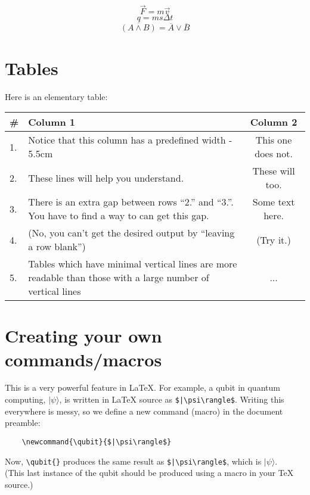 \documentclass[a4paper,10pt,titlepage]{article}
\newcommand{\qubit}{$|\psi\rangle$}
\begin{document}
\[\vec{F} = m\vec{v}\]
\[q = ms\Delta t\]
\[\overline{(A\land B)} = \overline{A}\lor \overline{B}\]

\section{Tables}

Here is an elementary table:
\begin{center}
  \begin{tabular}{l p{5.5cm} c}
    \textbf{\#} & \textbf{Column 1} & \textbf{Column 2} \\
    \hline
    \hline
    1. & Notice that this column has a predefined width - 5.5cm & This one does not. \\\hline
    2. & These lines will help you understand. & These will too. \\[50pt]\hline
    3. & There is an extra gap between rows ``2.'' and ``3.''. You have to find a way to can get this gap. & Some text here. \\\hline
    4. & (No, you can't get the desired output by ``leaving a row blank'') & (Try it.) \\ \hline
    5. & Tables which have minimal vertical lines are more readable than those with a large number of vertical lines & ... \\\hline
    \hline
  \end{tabular}
\end{center}

\section{Creating your own commands/macros}

This is a very powerful feature in \LaTeX{}. For example, a qubit in
quantum computing, $|\psi\rangle$, is written in \LaTeX{} source as
\verb#$|\psi\rangle$#. Writing this everywhere is messy, so we define
a new command (macro) in the document preamble:
\begin{verbatim}
    \newcommand{\qubit}{$|\psi\rangle$}
\end{verbatim}
Now, \verb#\qubit{}# produces the same result as
\verb#$|\psi\rangle$#, which is \qubit{}.\\(This last instance of
the qubit should be produced using a macro in your \TeX{} source.)
\end{document}
